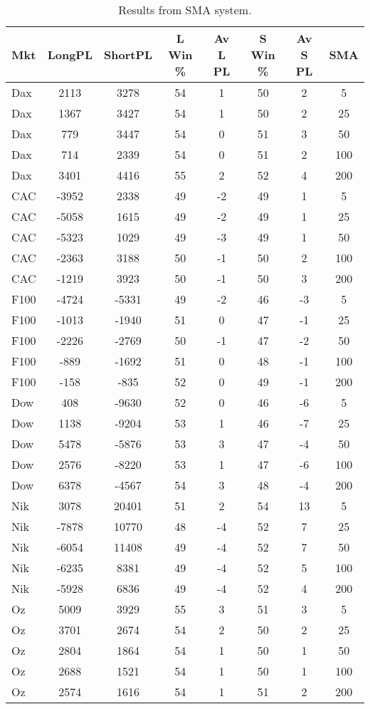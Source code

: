 \begin{table}[ht]
\centering
\caption[SMA Base System]{Results from SMA system.} 
\label{tab:sma_results}
\begin{tabular}{lccccccc}
  \toprule Mkt & LongPL & ShortPL & L Win \% & Av L PL & S Win \% & Av S PL & SMA \\ 
  \midrule Dax & 2113 & 3278 & 54 & 1 & 50 & 2 & 5 \\ 
  Dax & 1367 & 3427 & 54 & 1 & 50 & 2 & 25 \\ 
  Dax & 779 & 3447 & 54 & 0 & 51 & 3 & 50 \\ 
  Dax & 714 & 2339 & 54 & 0 & 51 & 2 & 100 \\ 
  Dax & 3401 & 4416 & 55 & 2 & 52 & 4 & 200 \\ 
  CAC & -3952 & 2338 & 49 & -2 & 49 & 1 & 5 \\ 
  CAC & -5058 & 1615 & 49 & -2 & 49 & 1 & 25 \\ 
  CAC & -5323 & 1029 & 49 & -3 & 49 & 1 & 50 \\ 
  CAC & -2363 & 3188 & 50 & -1 & 50 & 2 & 100 \\ 
  CAC & -1219 & 3923 & 50 & -1 & 50 & 3 & 200 \\ 
  F100 & -4724 & -5331 & 49 & -2 & 46 & -3 & 5 \\ 
  F100 & -1013 & -1940 & 51 & 0 & 47 & -1 & 25 \\ 
  F100 & -2226 & -2769 & 50 & -1 & 47 & -2 & 50 \\ 
  F100 & -889 & -1692 & 51 & 0 & 48 & -1 & 100 \\ 
  F100 & -158 & -835 & 52 & 0 & 49 & -1 & 200 \\ 
  Dow & 408 & -9630 & 52 & 0 & 46 & -6 & 5 \\ 
  Dow & 1138 & -9204 & 53 & 1 & 46 & -7 & 25 \\ 
  Dow & 5478 & -5876 & 53 & 3 & 47 & -4 & 50 \\ 
  Dow & 2576 & -8220 & 53 & 1 & 47 & -6 & 100 \\ 
  Dow & 6378 & -4567 & 54 & 3 & 48 & -4 & 200 \\ 
  Nik & 3078 & 20401 & 51 & 2 & 54 & 13 & 5 \\ 
  Nik & -7878 & 10770 & 48 & -4 & 52 & 7 & 25 \\ 
  Nik & -6054 & 11408 & 49 & -4 & 52 & 7 & 50 \\ 
  Nik & -6235 & 8381 & 49 & -4 & 52 & 5 & 100 \\ 
  Nik & -5928 & 6836 & 49 & -4 & 52 & 4 & 200 \\ 
  Oz & 5009 & 3929 & 55 & 3 & 51 & 3 & 5 \\ 
  Oz & 3701 & 2674 & 54 & 2 & 50 & 2 & 25 \\ 
  Oz & 2804 & 1864 & 54 & 1 & 50 & 1 & 50 \\ 
  Oz & 2688 & 1521 & 54 & 1 & 50 & 1 & 100 \\ 
  Oz & 2574 & 1616 & 54 & 1 & 51 & 2 & 200 \\ 
   \bottomrule \end{tabular}
\end{table}
